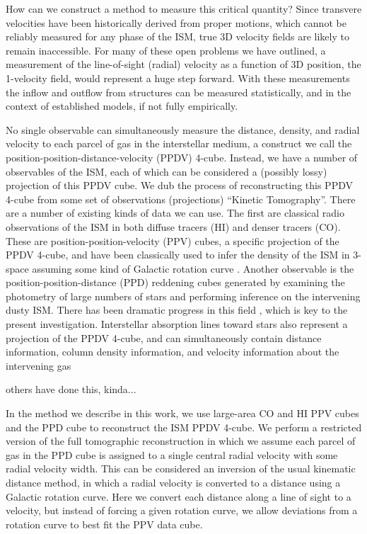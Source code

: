 How can we construct a method to measure this critical quantity? Since transvere velocities have been historically derived from proper motions, which cannot be reliably measured for any phase of the ISM, true 3D velocity fields are likely to remain inaccessible. 
For many of these open problems we have outlined, a measurement of the line-of-sight (radial) velocity as a function of 3D position, the 1-velocity field, would represent a huge step forward. With these measurements the inflow and outflow from structures can be measured statistically, and in the context of established models, if not fully empirically. 

No single observable can simultaneously measure the distance, density, and radial velocity to each parcel of gas in the interstellar medium, a construct we call the position-position-distance-velocity (PPDV) 4-cube. Instead, we have a number of observables of the ISM, each of which can be considered a (possibly lossy) projection of this PPDV cube. We dub the process of reconstructing this PPDV 4-cube from some set of observations (projections) ``Kinetic Tomography''. There are a number of existing kinds of data we can use. The first are classical radio observations of the ISM in both diffuse tracers (HI) and denser tracers (CO). These are position-position-velocity (PPV) cubes, a specific projection of the PPDV 4-cube, and have been classically used to infer the density of the ISM in 3-space assuming some kind of Galactic rotation curve \citep[e.g.][]{Levine_2006}. Another observable is the position-position-distance (PPD) reddening cubes generated by examining the photometry of large numbers of stars and performing inference on the intervening dusty ISM. There has been dramatic progress in this field \cite{Marshall_2006, Lallement_2014, Green_2015}, which is key to the present investigation. Interstellar absorption lines toward stars also represent a projection of the PPDV 4-cube, and can simultaneously contain distance information, column density information, and velocity information about the intervening gas \cite{Welsh10,Zasowski_2014,2015MmSAI..86..521Z}

others have done this, kinda... \cite{1972A&A....16..118S} \cite{Foster_2006} \cite{Reid_2016}

In the method we describe in this work, we use large-area CO and HI PPV cubes and the \cite{Green_2015} PPD cube to reconstruct the ISM PPDV 4-cube. We perform a restricted version of the full tomographic reconstruction in which we assume each parcel of gas in the PPD cube is assigned to a single central radial velocity with some radial velocity width. This can be considered an inversion of the usual kinematic distance method, in which a radial velocity is converted to a distance using a Galactic rotation curve. Here we convert each distance along a line of sight to a velocity, but instead of forcing a given rotation curve, we allow deviations from a rotation curve to best fit the PPV data cube.

